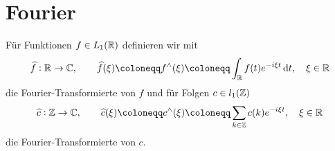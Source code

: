 \section{Fourier}

\begin{definition}
Für Funktionen $ f \in L_{1}(\mathbb{R}) $ definieren wir mit
\[
  \widehat{f} : \R \rightarrow \C, \qquad
  \widehat{f}(\xi) \coloneqq f^{\wedge}(\xi) \coloneqq 
  \int_{\R} f(t) e^{-i\xi t} \dif t, \quad \xi \in \R
\]
die Fourier-Transformierte von $ f $ und für Folgen $ c \in l_{1}(\mathbb{Z}) $
\[
  \widehat{c} : \Z \rightarrow \C, \qquad
  \widehat{c}(\xi) \coloneqq c^{\wedge}(\xi) \coloneqq 
  \sum_{k \in \Z} c(k) e^{-i\xi t}, \quad \xi \in \R
\]
die Fourier-Transformierte von $ c $.
\end{definition}

